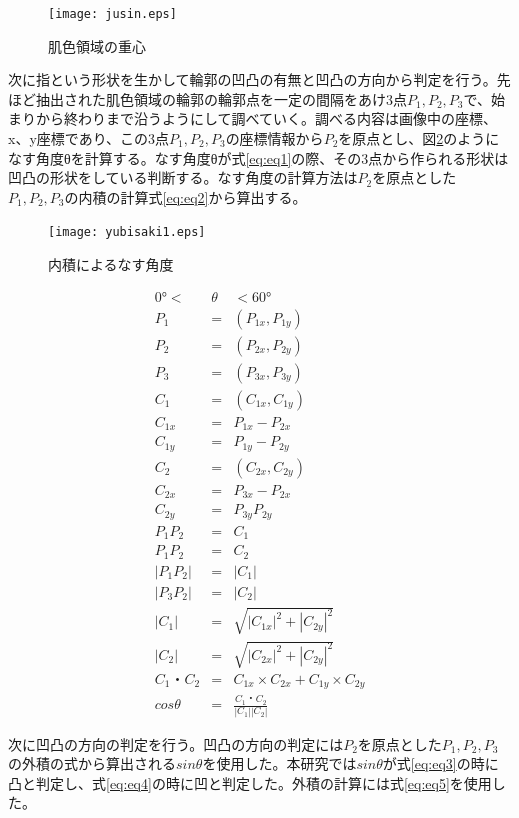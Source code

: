 \documentclass[11pt,a4j, titlepage]{jarticle} %
\begin{document}
\begin{figure}[H]
	\centering
	\texttt{[image: jusin.eps]}
	\caption{肌色領域の重心}
	\label{fig:f21}
\end{figure}

次に指という形状を生かして輪郭の凹凸の有無と凹凸の方向から判定を行う。先ほど抽出された肌色領域の輪郭の輪郭点を一定の間隔をあけ3点$P_1,P_2,P_3$で、始まりから終わりまで沿うようにして調べていく。調べる内容は画像中の座標、x、y座標であり、この3点$P_1,P_2,P_3$の座標情報から$P_2$を原点とし、図\ref{fig:f17}のようになす角度θを計算する。なす角度θが式\ref{eq:eq1}の際、その3点から作られる形状は凹凸の形状をしている判断する。なす角度の計算方法は$P_2$を原点とした$P_1,P_2,P_3$の内積の計算式\ref{eq:eq2}から算出する。

\begin{figure}[H]
	\centering
	\texttt{[image: yubisaki1.eps]}
	\caption{内積によるなす角度}
	\label{fig:f17}
\end{figure}

\begin{eqnarray}
0°<&θ&<60° \label{eq:eq1} \\
P_1&=&(P_{1x}, P_{1y}) \\
P_2&=&(P_{2x}, P_{2y}) \\
P_3&=&(P_{3x}, P_{3y}) \\
C_1&=&(C_{1x}, C_{1y}) \\
C_{1x}&=&P_{1x}-P_{2x} \\
C_{1y}&=&P_{1y}-P_{2y} \\
C_2&=&(C_{2x}, C_{2y}) \\
C_{2x}&=&P_{3x}-P_{2x} \\
C_{2y}&=&P_{3y}P_{2y} \\
P_1P_2&=&C_1 \\
P_1P_2&=&C_2 \\
|P_1P_2|&=&|C_1| \\
|P_3P_2|&=&|C_2| \\
|C_1|&=&\sqrt{|C_{1x}|^2+|C_{2y}|^2} \\
|C_2|&=&\sqrt{|C_{2x}|^2+|C_{2y}|^2} \\
C_1・C_2&=&C_{1x}×C_{2x}+C_{1y}×C_{2y} \\
cos{θ}&=&\frac{C_1・C_2}{|C_1||C_2|} \label{eq:eq2}
\end{eqnarray}

次に凹凸の方向の判定を行う。凹凸の方向の判定には$P_2$を原点とした$P_1, P_2, P_3$の外積の式から算出される$sin{θ}$を使用した。本研究では$sin{θ}$が式\ref{eq:eq3}の時に凸と判定し、式\ref{eq:eq4}の時に凹と判定した。外積の計算には式\ref{eq:eq5}を使用した。
\end{document}
